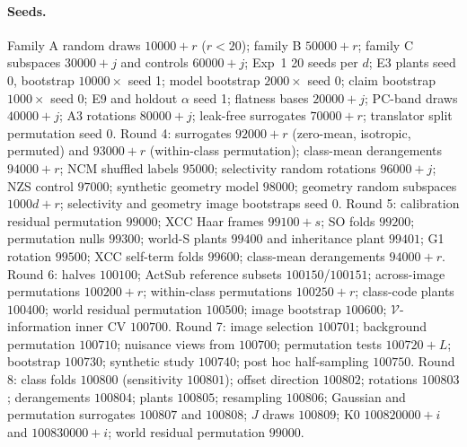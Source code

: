 \documentclass[10pt]{article}
\begin{document}
\paragraph{Seeds.}
Family A random draws $10000{+}r$ ($r<20$); family B $50000{+}r$; family C subspaces $30000{+}j$ and controls $60000{+}j$; Exp~1 20 seeds per $d$; E3 plants seed 0, bootstrap $10000\times$ seed 1; model bootstrap $2000\times$ seed 0; claim bootstrap $1000\times$ seed 0; E9 and holdout $\alpha$ seed 1; flatness bases $20000{+}j$; PC-band draws $40000{+}j$; A3 rotations $80000{+}j$; leak-free surrogates $70000{+}r$; translator split permutation seed 0.
Round 4: surrogates $92000{+}r$ (zero-mean, isotropic, permuted) and $93000{+}r$ (within-class permutation); class-mean derangements $94000{+}r$; NCM shuffled labels $95000$; selectivity random rotations $96000{+}j$; NZS control $97000$; synthetic geometry model $98000$; geometry random subspaces $1000d{+}r$; selectivity and geometry image bootstraps seed 0.
Round 5: calibration residual permutation $99000$; XCC Haar frames $99100{+}s$; SO folds $99200$; permutation nulls $99300$; world-S plants $99400$ and inheritance plant $99401$; G1 rotation $99500$; XCC self-term folds $99600$; class-mean derangements $94000{+}r$.
Round 6: halves $100100$; ActSub reference subsets $100150$/$100151$; across-image permutations $100200{+}r$; within-class permutations $100250{+}r$; class-code plants $100400$; world residual permutation $100500$; image bootstrap $100600$; $\mathcal{V}$-information inner CV $100700$.
Round 7: image selection $100701$; background permutation $100710$; nuisance views from $100700$; permutation tests $100720{+}L$; bootstrap $100730$; synthetic study $100740$; post hoc half-sampling $100750$.
Round 8: class folds $100800$ (sensitivity $100801$); offset direction $100802$; rotations $100803$; derangements $100804$; plants $100805$; resampling $100806$; Gaussian and permutation surrogates $100807$ and $100808$; $J$ draws $100809$; K0 $100820000{+}i$ and $100830000{+}i$; world residual permutation $99000$.
\end{document}

